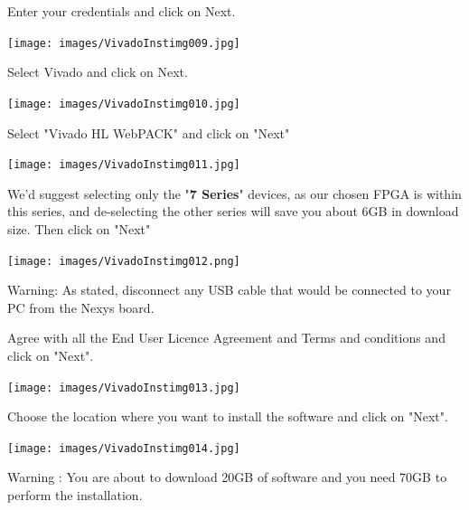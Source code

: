 \begin{minipage}{\linewidth}
  Enter your credentials and click on Next.
  \\
  \begin{center}
    \texttt{[image: images/VivadoInstimg009.jpg]}
  \end{center}
\end{minipage}

\begin{minipage}{\linewidth}
  Select Vivado and click on Next.
  \\
  \begin{center}
    \texttt{[image: images/VivadoInstimg010.jpg]}
  \end{center}
\end{minipage}

\begin{minipage}{\linewidth}
  Select "Vivado HL WebPACK" and click on "Next"
  \\
  \begin{center}
    \texttt{[image: images/VivadoInstimg011.jpg]}
  \end{center}
\end{minipage}

\begin{minipage}{\linewidth}
  We'd suggest selecting only the "\textbf{7 Series}" devices, as our chosen FPGA is within this series, and de-selecting the other series will save you about 6GB in download size. Then click on "Next"
  \\
  \begin{center}
    \texttt{[image: images/VivadoInstimg012.png]}
  \end{center}
  Warning: As stated, disconnect any USB cable that would be connected to your PC from the Nexys board.
\end{minipage}

\begin{minipage}{\linewidth}
  Agree with all the End User Licence Agreement and Terms and conditions and click on "Next".
  \\
  \begin{center}
    \texttt{[image: images/VivadoInstimg013.jpg]}
  \end{center}
\end{minipage}

\begin{minipage}{\linewidth}
  Choose the location where you want to install the software and click on "Next".
  \\
  \begin{center}
    \texttt{[image: images/VivadoInstimg014.jpg]}
  \end{center}
  Warning : You are about to download 20GB of software and you need 70GB to perform the installation.
\end{minipage}


